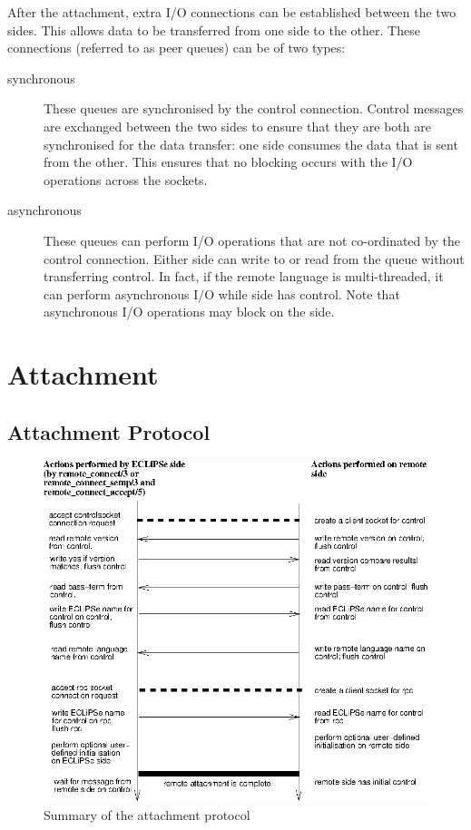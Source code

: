 After the attachment, extra I/O connections can be established between the
two sides. This allows data to be transferred from one side to the other.
These connections (referred to as peer queues) can be of two types:

\begin{description}
\item[synchronous] These queues are synchronised by the control
connection. Control messages are exchanged between the two sides to ensure
that they are both are synchronised for the data transfer: one side
consumes the data that is sent from the other. This ensures that no
blocking occurs with the I/O operations across the sockets.

\item[asynchronous] These queues can perform I/O operations that are not
 co-ordinated by the control 
connection. Either side can write to or read from the queue 
without transferring control. In fact, if the remote language is
multi-threaded, it can perform asynchronous I/O while {\eclipse}
side has control. Note that asynchronous I/O
operations may block on the {\eclipse} side. 

\end{description}

\section{Attachment}
\label{remoteattach}
\subsection{Attachment Protocol}

\begin{figure}[hbt]
\begin{center}
\includegraphics{remoteconnect}
\end{center}
\caption{Summary of the attachment protocol}
\label{rattach}
\end{figure}



